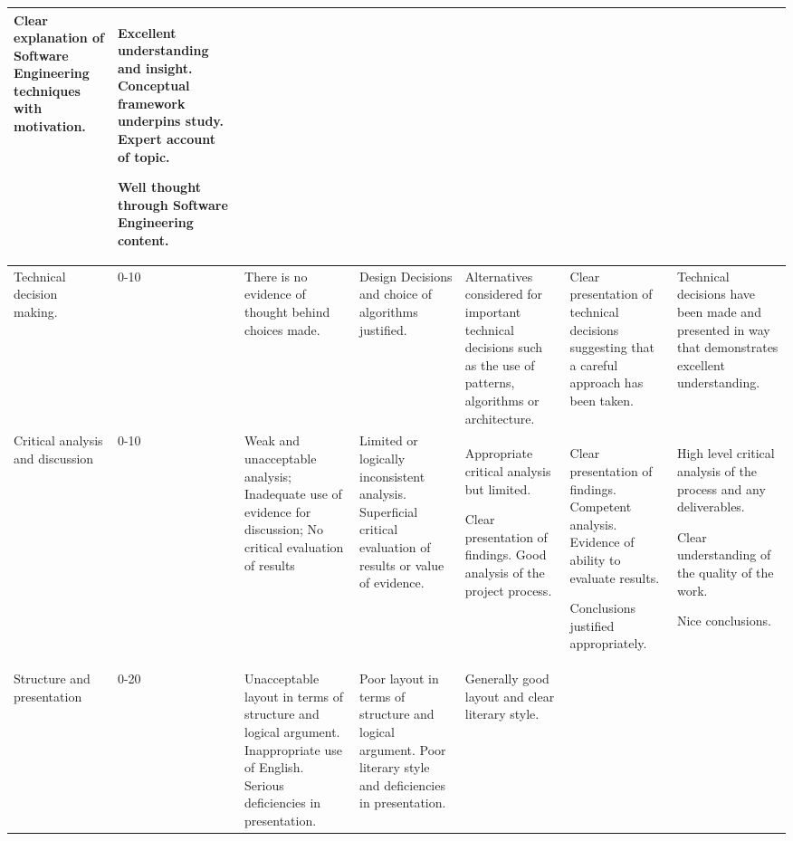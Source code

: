 \documentclass[11pt]{article}
\begin{document}
{\begin{tabular}{||p{2cm}|p{0.8cm}|p{2.9cm}|p{2.9cm}|p{2.9cm}|p{2.9cm}|p{2.9cm}||}
Clear explanation of Software Engineering techniques with motivation.

&Excellent understanding and
insight. Conceptual
framework underpins study.
Expert
account of topic.

Well thought through Software Engineering content.

\\
\hline
Technical decision making.
& 0-10 & There is no evidence of thought behind choices made. &
Design Decisions and choice of algorithms justified. &
Alternatives considered for important technical decisions such as the use of patterns, algorithms or architecture.&
Clear presentation of technical decisions suggesting that a careful approach has been taken. &
Technical decisions have been made and presented in way that demonstrates excellent understanding.

\\
\hline
Critical analysis and
discussion
& 0-10 &Weak and unacceptable
analysis; Inadequate use of
evidence for discussion;
No critical evaluation of
results &
Limited or logically
inconsistent analysis.
Superficial critical
evaluation of results or
value of evidence.
&
Appropriate critical analysis but limited.

Clear presentation of
findings.  Good analysis of the project process.
&
Clear presentation of findings.
Competent analysis.
Evidence of ability to evaluate
results.

Conclusions justified appropriately.
&
High level critical analysis of the process and any deliverables.

Clear understanding of the quality of the work.

Nice conclusions.%
\\
\hline
Structure and
presentation
& 0-20 &
Unacceptable layout in
terms of structure and
logical argument.
Inappropriate use of
English. Serious
deficiencies in
presentation.
&Poor layout in terms of
structure and logical
argument. Poor literary
style and deficiencies in
presentation.
&
Generally good layout and clear
literary style.


\end{tabular}}
\end{document}
